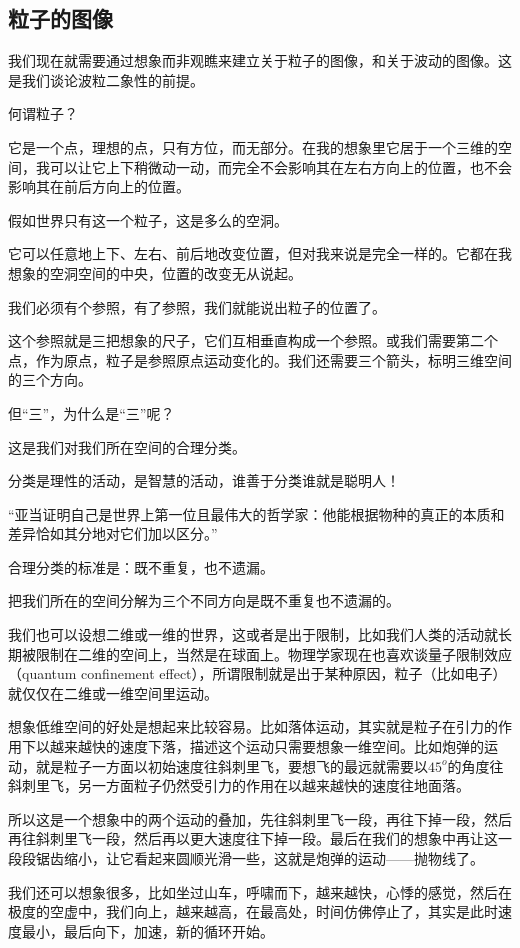 \subsection{粒子的图像}

我们现在就需要通过想象而非观瞧来建立关于粒子的图像，和关于波动的图像。这是我们谈论波粒二象性的前提。

何谓粒子？

它是一个点，理想的点，只有方位，而无部分。在我的想象里它居于一个三维的空间，我可以让它上下稍微动一动，而完全不会影响其在左右方向上的位置，也不会影响其在前后方向上的位置。

假如世界只有这一个粒子，这是多么的空洞。

它可以任意地上下、左右、前后地改变位置，但对我来说是完全一样的。它都在我想象的空洞空间的中央，位置的改变无从说起。

我们必须有个参照，有了参照，我们就能说出粒子的位置了。

这个参照就是三把想象的尺子，它们互相垂直构成一个参照。或我们需要第二个点，作为原点，粒子是参照原点运动变化的。我们还需要三个箭头，标明三维空间的三个方向。

但“三”，为什么是“三”呢？

这是我们对我们所在空间的合理分类。

分类是理性的活动，是智慧的活动，谁善于分类谁就是聪明人！

“亚当证明自己是世界上第一位且最伟大的哲学家：他能根据物种的真正的本质和差异恰如其分地对它们加以区分。”

合理分类的标准是：既不重复，也不遗漏。

把我们所在的空间分解为三个不同方向是既不重复也不遗漏的。

我们也可以设想二维或一维的世界，这或者是出于限制，比如我们人类的活动就长期被限制在二维的空间上，当然是在球面上。物理学家现在也喜欢谈量子限制效应（quantum confinement effect），所谓限制就是出于某种原因，粒子（比如电子）就仅仅在二维或一维空间里运动。

想象低维空间的好处是想起来比较容易。比如落体运动，其实就是粒子在引力的作用下以越来越快的速度下落，描述这个运动只需要想象一维空间。比如炮弹的运动，就是粒子一方面以初始速度往斜刺里飞，要想飞的最远就需要以$45^o$的角度往斜刺里飞，另一方面粒子仍然受引力的作用在以越来越快的速度往地面落。

所以这是一个想象中的两个运动的叠加，先往斜刺里飞一段，再往下掉一段，然后再往斜刺里飞一段，然后再以更大速度往下掉一段。最后在我们的想象中再让这一段段锯齿缩小，让它看起来圆顺光滑一些，这就是炮弹的运动——抛物线了。

我们还可以想象很多，比如坐过山车，呼啸而下，越来越快，心悸的感觉，然后在极度的空虚中，我们向上，越来越高，在最高处，时间仿佛停止了，其实是此时速度最小，最后向下，加速，新的循环开始。


